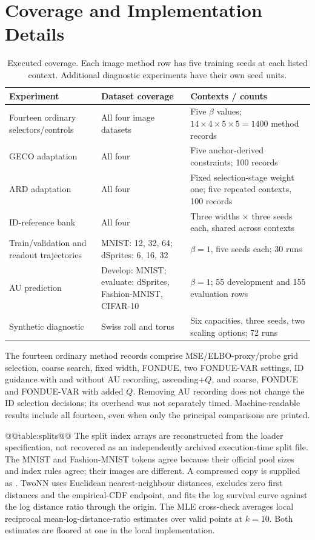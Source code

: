 \section{Coverage and Implementation Details}\label{app:coverage}
\begin{table}[H]
\caption{Executed coverage. Each image method row has five training
seeds at each listed context. Additional diagnostic experiments have
their own seed units.}
\label{tab:coverage}\small
\begin{tabularx}{\textwidth}{lXX}\toprule
Experiment & Dataset coverage & Contexts / counts \\\midrule
Fourteen ordinary selectors/controls & All four image datasets & Five $\beta$ values; $14\times4\times5\times5=1400$ method records \\
GECO adaptation & All four & Five anchor-derived constraints; 100 records \\
ARD adaptation & All four & Fixed selection-stage weight one; five repeated contexts, 100 records \\
ID-reference bank & All four & Three widths $\times$ three seeds each, shared across contexts \\
Train/validation and readout trajectories & MNIST: 12, 32, 64; dSprites: 6, 16, 32 & $\beta=1$, five seeds each; 30 runs \\
AU prediction & Develop: MNIST; evaluate: dSprites, Fashion-MNIST, CIFAR-10 & $\beta=1$; 55 development and 155 evaluation rows \\
Synthetic diagnostic & Swiss roll and torus & Six capacities, three seeds, two scaling options; 72 runs \\
\bottomrule\end{tabularx}
\end{table}

The fourteen ordinary method records comprise MSE/ELBO-proxy/probe grid
selection, coarse search, fixed width, FONDUE, two FONDUE-VAR settings,
ID guidance with and without AU recording, ascending+$Q$, and coarse,
FONDUE and FONDUE-VAR with added $Q$. Removing AU recording does not
change the ID selection decisions; its overhead was not separately
timed. Machine-readable results include all fourteen, even when only
the principal comparisons are printed.

@@table:splits@@
The split index arrays are reconstructed from the loader specification,
not recovered as an independently archived execution-time split file.
The MNIST and Fashion-MNIST tokens agree because their official pool
sizes and index rules agree; their images are different. A compressed
copy is supplied as .
TwoNN uses Euclidean nearest-neighbour distances, excludes zero first
distances and the empirical-CDF endpoint, and fits the log survival
curve against the log distance ratio through the origin. The MLE
cross-check averages local reciprocal mean-log-distance-ratio estimates
over valid points at $k=10$. Both estimates are floored at one in the
local implementation.

